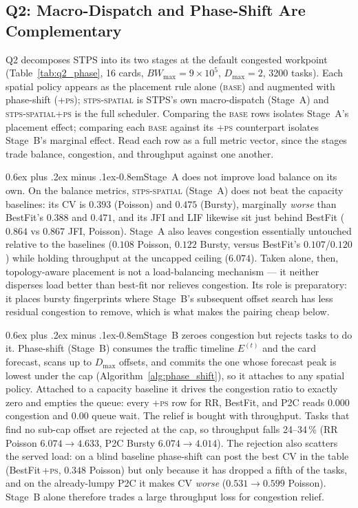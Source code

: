 \documentclass[letterpaper,twocolumn,10pt]{article}
\makeatletter
\newcommand{\tightparagraph}{\@startsection{paragraph}{4}{\z@}%
    {0.6ex plus .2ex minus .1ex}{-0.8em}{\normalfont\normalsize\bfseries}}
\makeatother
\begin{document}
\subsection{Q2: Macro-Dispatch and Phase-Shift Are Complementary}
\label{sec:eval:spatial}

Q2 decomposes STPS into its two stages at the default congested workpoint (Table~\ref{tab:q2_phase}, 16 cards, $BW_{\max}\!=\!9\!\times\!10^{5}$, $D_{\max}\!=\!2$, 3200 tasks). Each spatial policy appears as the placement rule alone (\textsc{base}) and augmented with phase-shift (\textsc{+ps}); \textsc{stps-spatial} is STPS's own macro-dispatch (Stage~A) and \textsc{stps-spatial+ps} is the full scheduler. Comparing the \textsc{base} rows isolates Stage~A's placement effect; comparing each \textsc{base} against its \textsc{+ps} counterpart isolates Stage~B's marginal effect. Read each row as a full metric vector, since the stages trade balance, congestion, and throughput against one another.

\tightparagraph{Stage~A does not improve load balance on its own.} On the balance metrics, \textsc{stps-spatial} (Stage~A) does not beat the capacity baselines: its CV is $0.393$ (Poisson) and $0.475$ (Bursty), marginally \emph{worse} than BestFit's $0.388$ and $0.471$, and its JFI and LIF likewise sit just behind BestFit ($0.864$ vs $0.867$ JFI, Poisson). Stage~A also leaves congestion essentially untouched relative to the baselines ($0.108$ Poisson, $0.122$ Bursty, versus BestFit's $0.107$/$0.120$) while holding throughput at the uncapped ceiling ($6.074$). Taken alone, then, topology-aware placement is not a load-balancing mechanism --- it neither disperses load better than best-fit nor relieves congestion. Its role is preparatory: it places bursty fingerprints where Stage~B's subsequent offset search has less residual congestion to remove, which is what makes the pairing cheap below.

\tightparagraph{Stage~B zeroes congestion but rejects tasks to do it.} Phase-shift (Stage~B) consumes the traffic timeline $E^{(t)}$ and the card forecast, scans up to $D_{\max}$ offsets, and commits the one whose forecast peak is lowest under the cap (Algorithm~\ref{alg:phase_shift}), so it attaches to any spatial policy. Attached to a capacity baseline it drives the congestion ratio to exactly zero and empties the queue: every \textsc{+ps} row for RR, BestFit, and P2C reads $0.000$ congestion and $0.00$ queue wait. The relief is bought with throughput. Tasks that find no sub-cap offset are rejected at the cap, so throughput falls 24--34\,\% (RR Poisson $6.074\!\to\!4.633$, P2C Bursty $6.074\!\to\!4.014$). The rejection also scatters the served load: on a blind baseline phase-shift can post the best CV in the table (BestFit\,\textsc{+ps}, $0.348$ Poisson) but only because it has dropped a fifth of the tasks, and on the already-lumpy P2C it makes CV \emph{worse} ($0.531\!\to\!0.599$ Poisson). Stage~B alone therefore trades a large throughput loss for congestion relief.
\end{document}
